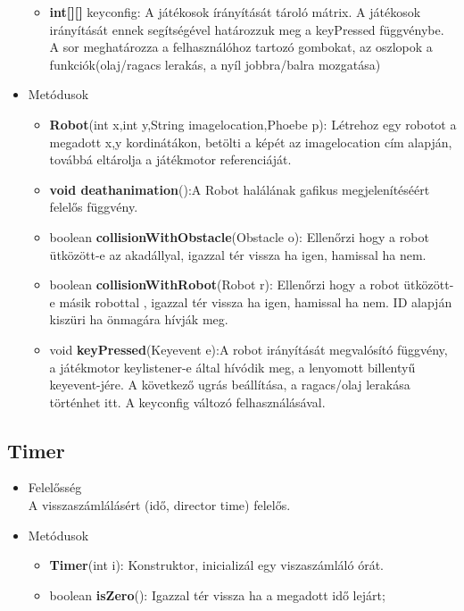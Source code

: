 \begin{itemize}
\begin{itemize}
		\item \textbf{int[][]} keyconfig: A játékosok írányítását tároló mátrix. A játékosok irányítását ennek segítségével határozzuk meg a keyPressed függvénybe. A sor meghatározza a felhasználóhoz tartozó gombokat, az oszlopok a funkciók(olaj/ragacs lerakás, a nyíl jobbra/balra mozgatása)
\end{itemize}
\item Metódusok\\
	\begin{itemize}
		\item \textbf{Robot}(int x,int y,String imagelocation,Phoebe p): Létrehoz egy robotot a megadott x,y kordinátákon, betölti a képét az imagelocation cím alapján, továbbá eltárolja a játékmotor referenciáját.
		\item \textbf{void deathanimation}():A Robot halálának gafikus megjelenítéséért felelős függvény.
		\item boolean \textbf{collisionWithObstacle}(Obstacle o): Ellenőrzi hogy a robot ütközött-e az akadállyal, igazzal tér vissza ha igen, hamissal ha nem.
		\item boolean \textbf{collisionWithRobot}(Robot r): Ellenőrzi hogy a robot ütközött-e másik robottal , igazzal tér vissza ha igen, hamissal ha nem. ID alapján kiszüri ha önmagára hívják meg.
		\item void \textbf{keyPressed}(Keyevent e):A robot irányítását megvalósító függvény, a játékmotor keylistener-e által hívódik meg, a lenyomott billentyű keyevent-jére. A következő ugrás beállítása, a ragacs/olaj lerakása történhet itt. A keyconfig változó felhasználásával.
	\end{itemize}
\end{itemize}

\subsection{Timer}
\begin{itemize}
\item Felelősség\\
A visszaszámlálásért (idő, director time) felelős.
\item Metódusok
	\begin{itemize}
		\item \textbf{Timer}(int i): Konstruktor, inicializál egy viszaszámláló órát.
		\item boolean \textbf{isZero}(): Igazzal tér vissza ha a megadott idő lejárt;
	\end{itemize}
\end{itemize}

